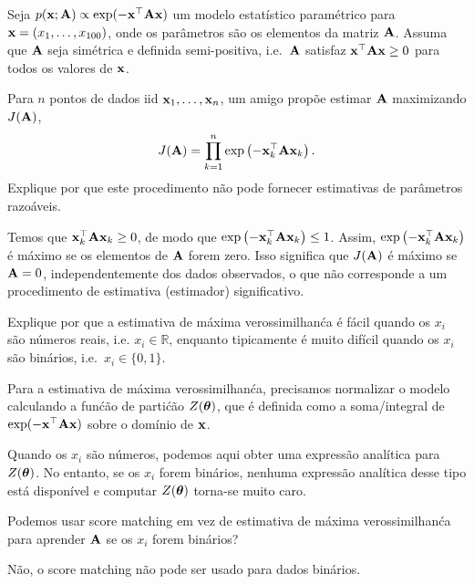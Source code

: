 Seja $p(\mathbf{x}; \mathbf{A}) \propto \exp(-\mathbf{x}^\top \mathbf{A} \mathbf{x})$ um modelo estat\'istico param\'etrico
para $\mathbf{x} = (x_1, \ldots, x_{100})$, onde os
par\^ametros s\~ao os elementos da matriz $\mathbf{A}$. Assuma que $\mathbf{A}$ seja
sim\'etrica e definida semi-positiva, i.e.\ $\mathbf{A}$ satisfaz $\mathbf{x}^\top
\mathbf{A} \mathbf{x} \ge 0$ para todos os valores de $\mathbf{x}$.

\begin{exenumerate}
    \item Para $n$ pontos de dados iid $\mathbf{x}_1, \ldots, \mathbf{x}_n$, um amigo
    prop\~oe estimar $\mathbf{A}$ maximizando $J(\mathbf{A})$,
    \begin{equation}
        J(\mathbf{A}) = \prod_{k=1}^n \exp\left( - \mathbf{x}_k^\top \mathbf{A} \mathbf{x}_k \right).
    \end{equation}
    Explique por que este procedimento n\~ao pode fornecer estimativas de par\^ametros razo\'aveis. 
    
    \begin{solution}
        Temos que $\mathbf{x}_k^\top \mathbf{A} \mathbf{x}_k \ge 0$, de modo que $\exp\left( -
        \mathbf{x}_k^\top \mathbf{A} \mathbf{x}_k \right) \le 1$. Assim, $\exp\left( - \mathbf{x}_k^\top \mathbf{A}
        \mathbf{x}_k \right)$ \'e m\'aximo se os elementos de $\mathbf{A}$ forem zero. Isso
        significa que $J(\mathbf{A})$ \'e m\'aximo se $\mathbf{A} = 0$, independentemente dos dados
        observados, o que n\~ao corresponde a um procedimento de estimativa
        (estimador) significativo.
        
    \end{solution}
    
    \item Explique por que a estimativa de m\'axima verossimilhan\'ca \'e f\'acil quando os $x_i$
    s\~ao n\'umeros reais, i.e. $x_i \in \mathbb{R}$, enquanto tipicamente \'e muito
    dif\'icil quando os $x_i$ s\~ao bin\'arios, i.e.\ $x_i \in \{0,1\}$.
    
    \begin{solution}
        
        Para a estimativa de m\'axima verossimilhan\'ca, precisamos normalizar o
        modelo calculando a fun\'c\~ao de parti\'c\~ao $Z(\boldsymbol{\theta})$, que \'e
        definida como a soma/integral de $\exp(-\mathbf{x}^\top \mathbf{A} \mathbf{x})$ sobre o
        dom\'inio de $\mathbf{x}$.
        
        Quando os $x_i$ s\~ao n\'umeros, podemos aqui obter uma
        express\~ao anal\'itica para $Z(\boldsymbol{\theta})$. No entanto, se os $x_i$ forem bin\'arios, nenhuma
        express\~ao anal\'itica desse tipo est\'a dispon\'ivel e computar $Z(\boldsymbol{\theta})$
        torna-se muito caro.
        
    \end{solution}
    
    \item Podemos usar score matching em vez de estimativa de m\'axima
    verossimilhan\'ca para aprender $\mathbf{A}$ se os $x_i$ forem bin\'arios?
    
    \begin{solution}
        N\~ao, o score matching n\~ao pode ser usado para dados bin\'arios.
    \end{solution}
    
    
\end{exenumerate}